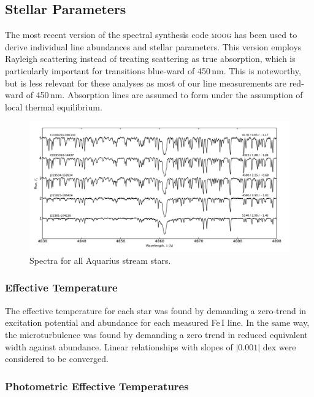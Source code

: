 \documentclass{emulateapj}
\begin{document}
\subsection{Stellar Parameters}
The most recent version of the spectral synthesis code \textsc{moog} \citep{sneden;et-al_1973} has been used to derive individual line abundances and stellar parameters. This version employs Rayleigh scattering \citep{sobeck;et-al_2011} instead of treating scattering as true absorption, which is particularly important for transitions blue-ward of 450\,nm. This is noteworthy, but is less relevant for these analyses as most of our line measurements are red-ward of 450\,nm. Absorption lines are assumed to form under the assumption of local thermal equilibrium. 


\begin{figure}[t!]
	\includegraphics[width=\textwidth]{./figures/spectra-h-alpha.pdf}
	\caption{Spectra for all Aquarius stream stars.}
	\label{fig:spectra-h-alpha}
\end{figure}

\subsubsection{Effective Temperature}
The effective temperature for each star was found by demanding a zero-trend in excitation potential and abundance for each measured Fe\,I line. In the same way, the microturbulence was found by demanding a zero trend in reduced equivalent width against abundance. Linear relationships with slopes of $|0.001|$ dex were considered to be converged. 

\subsubsection{Photometric Effective Temperatures}
\label{sec:photometric-temperatures}
\end{document}
